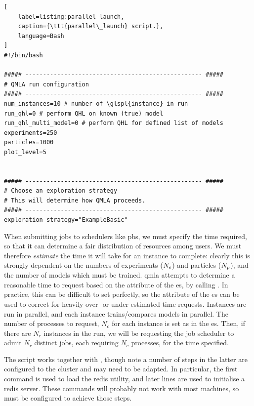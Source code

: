 \begin{lstlisting}[
    label=listing:parallel_launch,
    caption={\ttt{parallel\_launch} script.},
    language=Bash
]
#!/bin/bash

##### -------------------------------------------------- #####
# QMLA run configuration
##### -------------------------------------------------- #####
num_instances=10 # number of \glspl{instance} in run
run_qhl=0 # perform QHL on known (true) model
run_qhl_multi_model=0 # perform QHL for defined list of models
experiments=250
particles=1000
plot_level=5


##### -------------------------------------------------- #####
# Choose an exploration strategy 
# This will determine how QMLA proceeds. 
##### -------------------------------------------------- #####
exploration_strategy="ExampleBasic"
\end{lstlisting}    

\par 

When submitting jobs to schedulers like \gls{pbs}, we must specify the time required, 
    so that it can determine a fair distribution of resources among users. 
We must therefore \emph{estimate} the time it will take for an \gls{instance} to complete:
    clearly this is strongly dependent on the numbers of experiments ($N_e$) and particles ($N_p$), 
    and the number of models which must be trained. 
\gls{qmla} attempts to determine a reasonable time to request based on the 
    attribute of the \gls{es}, by calling . 
In practice, this can be difficult to set perfectly,
    so the  attribute of the \gls{es} can be used to correct 
    for heavily over- or under-estimated time requests. 
Instances are run in parallel, and each \gls{instance} trains/compares models in parallel. 
The number of processes to request, $N_c$ for each \gls{instance} is set as  
        in the \gls{es}.
Then, if there are $N_r$ \glspl{instance} in the run, we will be requesting the job scheduler to admit 
    $N_r$ distinct jobs, each requiring $N_c$ processes, for the time specified. 

\par 

The  script works together with , 
    though note a number of steps in the latter are configured to the cluster and may need to be adapted. 
In particular, the first command is used to load the redis utility, and later lines are used to initialise a 
redis server. 
These commands will probably not work with most machines, so must be configured to achieve those steps. 


